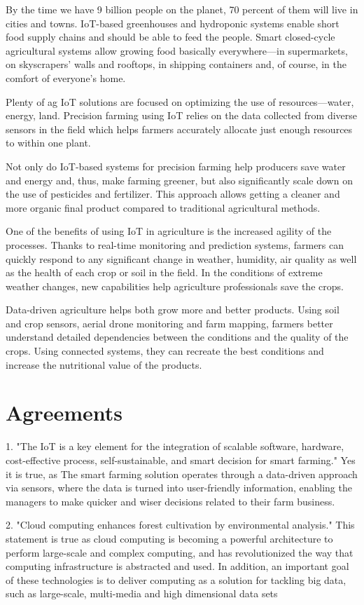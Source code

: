 \documentclass{article}
\begin{document}
By the time we have 9 billion people on the planet, 70 percent of them will live in cities and towns. IoT-based greenhouses and hydroponic systems enable short food supply chains and should be able to feed the people. Smart closed-cycle agricultural systems allow growing food basically everywhere—in supermarkets, on skyscrapers’ walls and rooftops, in shipping containers and, of course, in the comfort of everyone’s home.


Plenty of ag IoT solutions are focused on optimizing the use of resources—water, energy, land. Precision farming using IoT relies on the data collected from diverse sensors in the field which helps farmers accurately allocate just enough resources to within one plant.

Not only do IoT-based systems for precision farming help producers save water and energy and, thus, make farming greener, but also significantly scale down on the use of pesticides and fertilizer. This approach allows getting a cleaner and more organic final product compared to traditional agricultural methods.

One of the benefits of using IoT in agriculture is the increased agility of the processes. Thanks to real-time monitoring and prediction systems, farmers can quickly respond to any significant change in weather, humidity, air quality as well as the health of each crop or soil in the field. In the conditions of extreme weather changes, new capabilities help agriculture professionals save the crops.

Data-driven agriculture helps both grow more and better products. Using soil and crop sensors, aerial drone monitoring and farm mapping, farmers better understand detailed dependencies between the conditions and the quality of the crops. Using connected systems, they can recreate the best conditions and increase the nutritional value of the products.


\section{Agreements}
1. "The IoT is a key element for the integration of scalable software, hardware, cost-effective process, self-sustainable, and smart decision for smart farming." Yes it is true, as The smart farming solution operates through a data-driven approach via sensors, where the data is turned into user-friendly information, enabling the managers to make quicker and wiser decisions related to their farm business.

2. "Cloud computing enhances forest cultivation by environmental analysis." This statement is true as cloud computing is becoming a powerful architecture to 
perform large-scale and complex computing, and has revolutionized the way that computing 
infrastructure is abstracted and used. In addition, an important goal of these technologies is to 
deliver computing as a solution for tackling big data, such as large-scale, multi-media and high 
dimensional data sets
\end{document}
